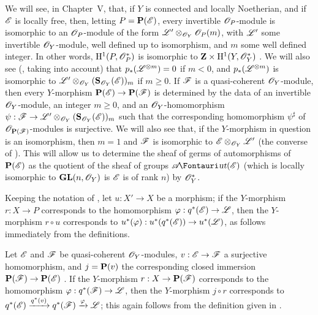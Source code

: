 \begin{remark}[4.2.7]
\label{II.4.2.7}
We will see, in Chapter~V, that, if $Y$ is connected and locally Noetherian, and if $\mathscr{E}$ is locally free, then, letting $P=\mathbf{P}(\mathscr{E})$, every invertible $\mathscr{O}_P$-module is isomorphic to an $\mathscr{O}_P$-module of the form $\mathscr{L}'\otimes_{\mathscr{O}_Y}\mathscr{O}_P(m)$, with $\mathscr{L}'$ some invertible $\mathscr{O}_Y$-module, well defined up to isomorphism, and $m$ some well defined integer.
In other words, $\mathrm{H}^1(P,\mathscr{O}_P^*)$ is isomorphic to $\mathbf{Z}\times\mathrm{H}^1(Y,\mathscr{O}_Y^*)$ .
We will also see (, taking  into account) that $p_*(\mathscr{L}^{\otimes m})=0$ if $m<0$, and $p_*(\mathscr{L}^{\otimes m})$ is isomorphic to $\mathscr{L}'\otimes_{\mathscr{O}_Y}(\mathbf{S}_{\mathscr{O}_Y}(\mathscr{E}))_m$ if $m\geq0$.
If $\mathscr{F}$ is a quasi-coherent $\mathscr{O}_Y$-module, then every $Y$-morphism $\bb{P}(\sh{E})\to\bb{P}(\sh{F})$ is determined by the data of an invertible $\mathscr{O}_Y$-module, an integer $m\geq0$, and an $\mathscr{O}_Y$-homomorphism $\psi:\sh{F}\to\sh{L}'\otimes_{\sh{O}_Y}(\bb{S}_{\sh{O}_Y}(\sh{E}))_m$ such that the corresponding homomorphism $\psi^\sharp$ of $\mathscr{O}_{\mathbf{P}(\mathscr{F})}$-modules is surjective.
We will also see that, if the $Y$-morphism in question is an isomorphism, then $m=1$ and $\mathscr{F}$ is isomorphic to $\mathscr{E}\otimes_{\mathscr{O}_Y}\mathscr{L}'$ (the converse of ).
This will allow us to determine the sheaf of germs of automorphisms of $\mathbf{P}(\mathscr{E})$ as the quotient of the sheaf of groups $\shAut(\sh{E})$ (which is locally isomorphic to $\mathbf{GL}(n,\mathscr{O}_Y)$ is $\mathscr{E}$ is of rank $n$) by $\mathscr{O}_Y^*$.
\end{remark}

\begin{env}[4.2.8]
\label{II.4.2.8}
Keeping the notation of , let $u:X'\to X$ be a morphism;
if the $Y$-morphism $r:X\to P$ corresponds to the homomorphism $\varphi:q^*(\sh{E})\to\sh{L}$, then the $Y$-morphism $r\circ u$ corresponds to $u^*(\varphi):u^*(q^*(\sh{E}))\to u^*(\sh{L})$, as follows immediately from the definitions.
\end{env}

\begin{env}[4.2.9]
\label{II.4.2.9}
Let $\mathscr{E}$ and $\mathscr{F}$ be quasi-coherent $\mathscr{O}_Y$-modules, $v:\sh{E}\to\sh{F}$ a surjective homomorphism, and $j=\mathbf{P}(v)$ the corresponding closed immersion $\bb{P}(\sh{F})\to\bb{P}(\sh{E})$ .
If the $Y$-morphism $r:X\to\bb{P}(\sh{F})$ corresponds to the homomorphism $\varphi:q^*(\sh{F})\to\sh{L}$, then the
$Y$-morphism $j\circ r$ corresponds to $q^*(\mathscr{E})\xrightarrow{q^*(v)}q^*(\mathscr{F})\xrightarrow{\varphi}\mathscr{L}$;
this again follows from the definition given in .
\end{env}

